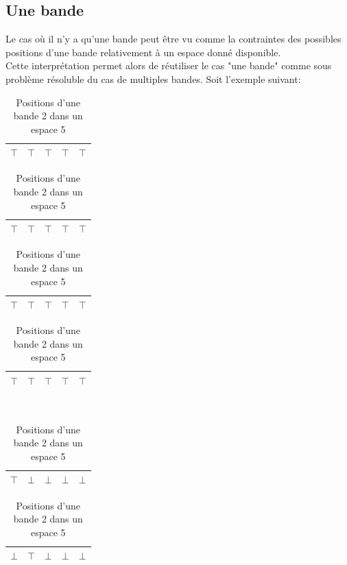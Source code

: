 \documentclass[a4paper,12pt]{report}
\newcommand\black{\cellcolor{black}}
\newcommand\grey{\cellcolor{black!50}}
\begin{document}
\subsection{Une bande}
Le cas où il n'y a qu'une bande peut être vu comme la contraintes des possibles positions d'une bande relativement à un espace donné disponible.\\
Cette interprétation permet alors de réutiliser le cas "une bande" comme sous problème résoluble du cas de multiples bandes.
Soit l'exemple suivant:
\begin{table}[H]
    \begin{subtable}[B]{0.5\textwidth}
    \centering
		\begin{tabular}{|c|c|c|c|c|}
			\hline
			\black $\top$ & \black $\top$  & \color{white}$\top$ & \color{white}$\top$ & \color{white}$\top$ \\ 			
			\hline
		\end{tabular}
		
		\begin{tabular}{|c|c|c|c|c|}
		\hline
		\color{white}$\top$ & \black $\top$ & \black $\top$  & \color{white}$\top$ & \color{white}$\top$ \\ 			
		\hline
		\end{tabular}	
		
		\begin{tabular}{|c|c|c|c|c|}
		\hline
		 \color{white}$\top$ & \color{white}$\top$ & \black $\top$ & \black $\top$  & \color{white}$\top$ \\ 			
		\hline
		\end{tabular}
		
		\begin{tabular}{|c|c|c|c|c|}
		\hline
		 \color{white}$\top$ &  \color{white}$\top$ & \color{white}$\top$ & \black $\top$ & \black $\top$ \\ 			
		\hline
		\end{tabular}
			
        \caption{Positions d'une bande 2 dans un espace 5}
        \label{table:exempleUneBande}
    \end{subtable}
    ~
    \begin{subtable}[B]{0.5\textwidth}
        \centering
			\begin{tabular}{|c|c|c|c|c|}
			\hline 
			\grey $\top$ & $\bot$ & $\bot$  & $\bot$ & $\bot$ \\ 
			\hline
			\end{tabular}
			
			\begin{tabular}{|c|c|c|c|c|}
			\hline 
			$\bot$ & \grey $\top$ & $\bot$  & $\bot$ & $\bot$ \\ 
			\hline
			\end{tabular}
			

\end{subtable}
\end{table}
\end{document}
